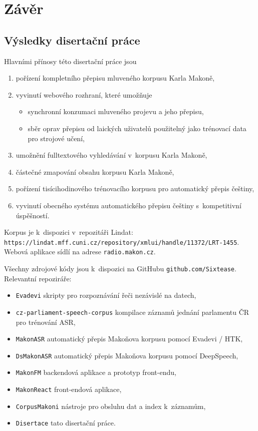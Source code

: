 \chapter{Závěr}
\label{kap:zaver}

\section{Výsledky disertační práce}

Hlavními přínosy této disertační práce jsou

\begin{enumerate}
\item{pořízení kompletního přepisu mluveného korpusu Karla Makoně,}
\item{vyvinutí webového rozhraní, které umožňuje
    \begin{itemize}
    \item{synchronní konzumaci mluveného projevu a jeho přepisu,}
    \item{
        sběr oprav přepisu od laických uživatelů použitelný jako trénovací data
        pro strojové učení,
    }
    \end{itemize}
}
\item{umožnění fulltextového vyhledávání v~korpusu Karla Makoně,}
\item{částečné zmapování obsahu korpusu Karla Makoně,}
\item{
    pořízení tisícihodinového trénovacího korpusu pro automatický přepis
    češtiny,
}
\item{
    vyvinutí obecného systému automatického přepisu češtiny s~kompetitivní
    úspěšností.
}
\end{enumerate}

Korpus je k~dispozici v~repozitáři Lindat:\\
\texttt{https://lindat.mff.cuni.cz/repository/xmlui/handle/11372/LRT-1455}.\\
Webová aplikace sídlí na adrese \texttt{radio.makon.cz}.

Všechny zdrojové kódy jsou k~dispozici na GitHubu \texttt{github.com/Sixtease}.
Relevantní repoziráře:
\begin{itemize}
\item{\texttt{Evadevi} skripty pro rozpoznávání řeči nezávislé na datech,}
\item{\texttt{cz-parliament-speech-corpus}
    kompilace záznamů jednání parlamentu ČR pro trénování ASR,
}
\item{\texttt{MakonASR} automatický přepis Makoňova korpusu pomocí Evadevi / HTK,}
\item{\texttt{DsMakonASR} automatický přepis Makoňova korpusu pomocí DeepSpeech,}
\item{\texttt{MakonFM} backendová aplikace a prototyp front-endu,}
\item{\texttt{MakonReact} front-endová aplikace,}
\item{\texttt{CorpusMakoni} nástroje pro obsluhu dat a index k~záznamům,}
\item{\texttt{Disertace} tato disertační práce.}
\end{itemize}

